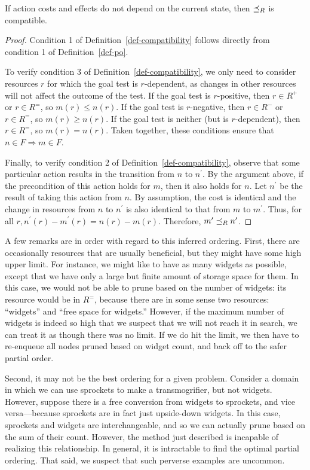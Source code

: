 \documentclass[letterpaper]{article}
\theoremstyle{plain} \newtheorem{theorem}{Theorem} \newtheorem{proposition}{Proposition} \newtheorem{lemma}{Lemma}
\theoremstyle{definition} \newtheorem{definition}{Definition} \newtheorem{conjecture}{Conjecture} \newtheorem*{example}{Example}
\theoremstyle{remark} \newtheorem*{remark}{Remark} \newtheorem*{note}{Note} \newtheorem{case}{Case}
\begin{document}
\begin{claim}{}{\label{clm-po-compatible}}
	If action costs and effects do not depend on the current state, then $\preceq_R$ is compatible.
\end{claim}
\begin{proof}
	Condition 1 of Definition~\ref{def-compatibility} follows directly from condition 1 of Definition~\ref{def-po}.
	
	To verify condition 3 of Definition~\ref{def-compatibility},
  we only need to consider resources $r$ for which the goal
  test is $r$-dependent, as changes in other resources will
  not affect the outcome of the test. If the goal test is
  $r$-positive, then $r \in R^+$ or $r \in R^=$, so $m(r) \le n(r)$. If the goal test is $r$-negative, then $r \in R^-$ or $r \in R^=$, so $m(r) \ge n(r)$. If the goal test is neither (but is $r$-dependent), then $r \in R^=$, so $m(r) = n(r)$. Taken together, these conditions ensure that $n \in F \Rightarrow m \in F$.
	
	Finally, to verify condition 2 of Definition~\ref{def-compatibility}, observe that some particular action results in the transition from $n$ to $n^\prime$. By the argument above, if the precondition of this action holds for $m$, then it also holds for $n$. Let
  $n^\prime$ be the result of taking this action from $n$. By
  assumption, the cost is identical and the change in resources
  from $n$ to $n^\prime$ is also identical to that from $m$ to
  $m^\prime$. Thus, for all $r, n^\prime(r) -
  m^\prime(r) = n(r) - m(r)$. Therefore, $m^\prime \preceq_R n^\prime$.
\end{proof}

A few remarks are in order with regard to this inferred ordering.
First, there are occasionally resources that are usually beneficial,
but they might have some high upper limit. For instance, we might
like to have as many widgets as possible, except that we have only
a large but finite amount of storage space for them.  In this case,
we would not be able to prune based on the number of widgets: its
resource would be in $R^=$, because there are in some sense two
resources: ``widgets'' and ``free space for widgets.'' However, if
the maximum number of widgets is indeed so high that we suspect
that we will not reach it in search, we can treat it as though there
was no limit. If we do hit the limit, we then have to re-enqueue
all nodes pruned based on widget count, and back off to the safer
partial order.

Second, it may not be the best ordering for a given problem. Consider
a domain in which we can use sprockets to make a transmogrifier,
but not widgets. However, suppose there is a free conversion from
widgets to sprockets, and vice versa---because sprockets are in
fact just upside-down widgets. In this case, sprockets and widgets
are interchangeable, and so we can actually prune based on the sum
of their count. However, the method just described is incapable of
realizing this relationship. In general, it is intractable to find
the optimal partial ordering. That said, we suspect that such perverse
examples are uncommon.
\end{document}
